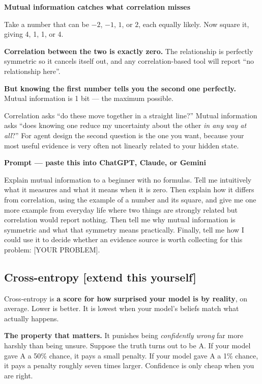 \documentclass[11pt,a4paper]{article}
\newcommand{\boxtitle}[1]{{\bfseries #1}\par\vspace{2pt}}
\newcommand{\extend}{\hfill{\footnotesize\sffamily\color{sbaccent}[extend this yourself]}}
\newenvironment{learnprompt}
  {\begin{sbbox}\boxtitle{Prompt --- paste this into ChatGPT, Claude, or Gemini}%
   \ttfamily\small\raggedright}
  {\end{sbbox}}
\begin{document}
\begin{sbbox}
\boxtitle{Mutual information catches what correlation misses}
Take a number that can be $-2$, $-1$, $1$, or $2$, each equally likely. Now square it, giving 4,
1, 1, or 4.

\textbf{Correlation between the two is exactly zero.} The relationship is perfectly symmetric so
it cancels itself out, and any correlation-based tool will report ``no relationship here''.

\textbf{But knowing the first number tells you the second one perfectly.} Mutual information is
1 bit --- the maximum possible.

Correlation asks ``do these move together in a straight line?'' Mutual information asks ``does
knowing one reduce my uncertainty about the other \emph{in any way at all}?'' For agent design
the second question is the one you want, because your most useful evidence is very often not
linearly related to your hidden state.
\end{sbbox}

\begin{learnprompt}
Explain mutual information to a beginner with no formulas. Tell me intuitively what it measures
and what it means when it is zero. Then explain how it differs from correlation, using the
example of a number and its square, and give me one more example from everyday life where two
things are strongly related but correlation would report nothing. Then tell me why mutual
information is symmetric and what that symmetry means practically. Finally, tell me how I could
use it to decide whether an evidence source is worth collecting for this problem: [YOUR PROBLEM].
\end{learnprompt}

\subsection{Cross-entropy \extend}

Cross-entropy is \textbf{a score for how surprised your model is by reality}, on average. Lower
is better. It is lowest when your model's beliefs match what actually happens.

\textbf{The property that matters.} It punishes being \emph{confidently wrong} far more harshly
than being unsure. Suppose the truth turns out to be A. If your model gave A a 50\% chance, it
pays a small penalty. If your model gave A a 1\% chance, it pays a penalty roughly seven times
larger. Confidence is only cheap when you are right.
\end{document}
